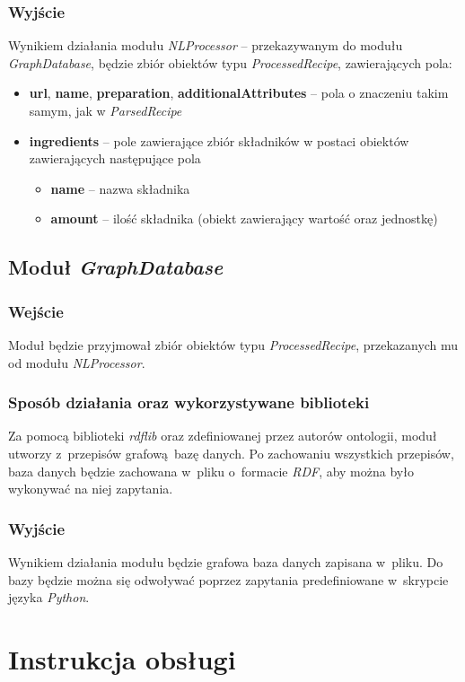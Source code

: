 \documentclass[11pt,a4paper]{article}
\begin{document}
\subsubsection{Wyjście}
Wynikiem działania modułu \textit{NLProcessor} -- przekazywanym do modułu \textit{GraphDatabase}, będzie zbiór obiektów typu \textit{ProcessedRecipe}, zawierających pola:
\begin{itemize}
  \item \textbf{url}, \textbf{name}, \textbf{preparation}, \textbf{additionalAttributes} -- pola o znaczeniu takim samym, jak w \textit{ParsedRecipe}
  \item \textbf{ingredients} -- pole zawierające zbiór składników w postaci obiektów zawierających następujące pola
  \begin{itemize}
    \item \textbf{name} -- nazwa składnika
    \item \textbf{amount} -- ilość składnika (obiekt zawierający wartość oraz jednostkę)
  \end{itemize}
\end{itemize}

\subsection{Moduł \textit{GraphDatabase}}
\subsubsection{Wejście}
Moduł będzie przyjmował zbiór obiektów typu \textit{ProcessedRecipe}, przekazanych mu od modułu \textit{NLProcessor}.
\subsubsection{Sposób działania oraz wykorzystywane biblioteki}
Za pomocą biblioteki \textit{rdflib} oraz zdefiniowanej przez autorów ontologii, moduł utworzy z~przepisów grafową bazę danych. Po zachowaniu wszystkich przepisów, baza danych będzie zachowana w~pliku o~formacie \textit{RDF}, aby można było wykonywać na niej zapytania.
\subsubsection{Wyjście}
Wynikiem działania modułu będzie grafowa baza danych zapisana w~pliku. Do bazy będzie można się odwoływać poprzez zapytania predefiniowane w~skrypcie języka \textit{Python}.

\section{Instrukcja obsługi}
\end{document}

